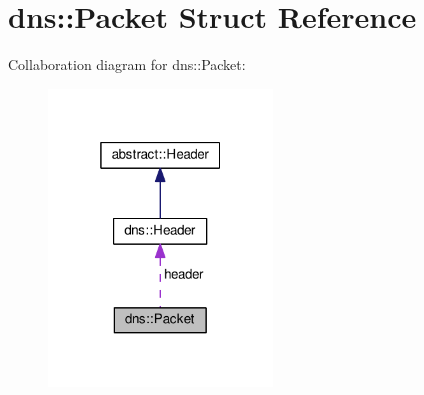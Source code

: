 \hypertarget{structdns_1_1Packet}{}\section{dns\+:\+:Packet Struct Reference}
\label{structdns_1_1Packet}


Collaboration diagram for dns\+:\+:Packet\+:\nopagebreak
\begin{figure}[H]
\begin{center}
\leavevmode
\includegraphics[width=169pt]{structdns_1_1Packet__coll__graph}
\end{center}
\end{figure}
